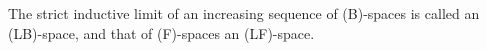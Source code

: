 The strict inductive limit of an increasing sequence of (B)-spaces is called an (LB)-space, and that of (F)-spaces an (LF)-space.
